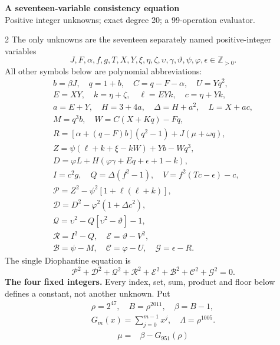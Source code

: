 \documentclass[10pt]{article}
\begin{document}
\begin{center}
{\large\bfseries A seventeen-variable consistency equation}\\[-1pt]
{\small Positive integer unknowns; exact degree 20; a 99-operation evaluator.}
\end{center}\vspace{-8pt}
\begin{multicols}{2}
\fontsize{8.6}{9.1}\selectfont
The only unknowns are the seventeen separately named positive-integer variables
\[
J,F,\alpha,f,g,T,X,Y,\xi,\eta,\zeta,\upsilon,\gamma,\vartheta,\psi,\varphi,\epsilon\in\mathbb Z_{>0}.
\]
All other symbols below are polynomial abbreviations:
\[
\begin{gathered}
b=\beta J,\quad q=1+b,\quad C=q-F-\alpha,\quad U=Yq^2,\\
E=XY,\quad k=\eta+\zeta,\quad \ell=EYk,\quad c=\eta+Yk,\\
a=E+Y,\quad H=3+4a,\quad\Delta=H+a^2,\quad L=X+ac,\\
M=q^3b,\quad W=C(X+Kq)-Fq,\\
R=[\alpha+(q-F)b](q^2-1)+J(\mu+\omega q),\\
Z=\psi(\ell+k+\xi-kW)+Yb-Wq^3,\\
D=\varphi L+H(\varphi\gamma+Eq+\epsilon+1-k),\\
I=c^2g,\quad Q=\Delta(f^2-1),\quad V=f^2(Tc-\epsilon)-c,\\
\mathcal{P}=Z^2-\psi^2[1+\ell(\ell+k)],\\
\mathcal{D}=D^2-\varphi^2(1+\Delta c^2),\\
\mathcal{Q}=\upsilon^2-Q[\upsilon^2-\vartheta]-1,\\
\mathcal{R}=I^2-Q,\quad \mathcal{E}=\vartheta-V^2,\\
\mathcal{B}=\psi-M,\quad \mathcal{C}=\varphi-U,\quad \mathcal{G}=\epsilon-R.
\end{gathered}
\]
The single Diophantine equation is
\[
\boxed{\mathcal{P}^2+\mathcal{D}^2+\mathcal{Q}^2+\mathcal{R}^2+\mathcal{E}^2+\mathcal{B}^2+\mathcal{C}^2+\mathcal{G}^2=0.}
\]
\textbf{The four fixed integers.}
Every index, set, sum, product and floor below defines a constant, not
another unknown. Put
\[
\begin{gathered}
\rho=2^{47},\quad B=\rho^{2011},\quad\beta=B-1,\\
G_m(x)=\sum_{j=0}^{m-1}x^j,\quad
\Lambda=\rho^{1005}.
\end{gathered}
\]
\begin{align*}
\mu={}&\beta-G_{951}(\rho)\\

\end{align*}
\end{multicols}
\end{document}
